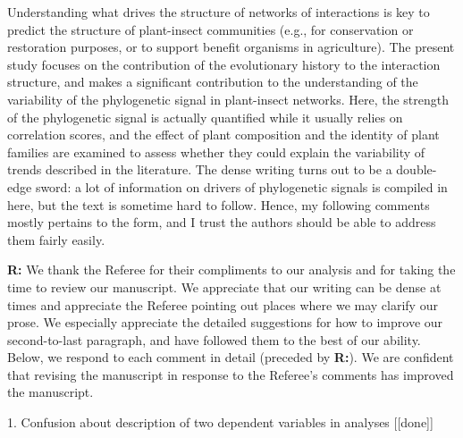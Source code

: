 \documentclass[12pt]{letter}
\newenvironment{refquote}{\bigskip \begin{it}}{\end{it}\smallskip}
\begin{document}
	\begin{refquote}
		Understanding what drives the structure of networks of interactions is key to predict the structure of plant-insect communities (e.g., for conservation or restoration purposes, or to support benefit organisms in agriculture).
		The present study focuses on the contribution of the evolutionary history to the interaction structure, and makes a significant contribution to the understanding of the variability of the phylogenetic signal in plant-insect networks. Here, the strength of the phylogenetic signal is actually quantified while it usually relies on correlation scores, and the effect of plant composition and the identity of plant families are examined to assess whether they could explain the variability of trends described in the literature.
		The dense writing turns out to be a double-edge sword: a lot of information on drivers of phylogenetic signals is compiled in here, but the text is sometime hard to follow. Hence, my following comments mostly pertains to the form, and I trust the authors should be able to address them fairly easily.
	\end{refquote}


	\textbf{R:} We thank the Referee for their compliments to our analysis and for taking the time to review our manuscript. We appreciate that our writing can be dense at times and appreciate the Referee pointing out places where we may clarify our prose. We especially appreciate the detailed suggestions for how to improve our second-to-last paragraph, and have followed them to the best of our ability. Below, we respond to each comment in detail (preceded by \textbf{R:}). We are confident that revising the manuscript in response to the Referee's comments has improved the manuscript.


	1. Confusion about description of two dependent variables in analyses [[done]]
\end{document}
